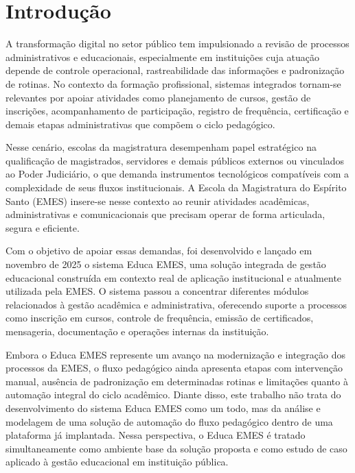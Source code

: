 %

\chapter{Introdução}
\label{sec:intro}

A transformação digital no setor público tem impulsionado a revisão de
processos administrativos e educacionais, especialmente em instituições cuja
atuação depende de controle operacional, rastreabilidade das informações e
padronização de rotinas. No contexto da formação profissional, sistemas
integrados tornam-se relevantes por apoiar atividades como planejamento de
cursos, gestão de inscrições, acompanhamento de participação, registro de
frequência, certificação e demais etapas administrativas que compõem o ciclo
pedagógico.

Nesse cenário, escolas da magistratura desempenham papel estratégico na
qualificação de magistrados, servidores e demais públicos externos ou vinculados ao Poder
Judiciário, o que demanda instrumentos tecnológicos compatíveis com a
complexidade de seus fluxos institucionais. A Escola da Magistratura do Espírito
Santo (EMES) insere-se nesse contexto ao reunir atividades acadêmicas,
administrativas e comunicacionais que precisam operar de forma articulada,
segura e eficiente.

Com o objetivo de apoiar essas demandas, foi desenvolvido e lançado em novembro
de 2025 o sistema Educa EMES, uma solução integrada de gestão educacional
construída em contexto real de aplicação institucional e atualmente utilizada
pela EMES. O sistema passou a concentrar diferentes módulos relacionados à
gestão acadêmica e administrativa, oferecendo suporte a processos como
inscrição em cursos, controle de frequência, emissão de certificados,
mensageria, documentação e operações internas da instituição.

Embora o Educa EMES represente um avanço na modernização e integração dos
processos da EMES, o fluxo pedagógico ainda apresenta etapas com intervenção
manual, ausência de padronização em determinadas rotinas e limitações quanto à
automação integral do ciclo acadêmico. Diante disso, este trabalho não trata do
desenvolvimento do sistema Educa EMES como um todo, mas da análise e modelagem
de uma solução de automação do fluxo pedagógico dentro de uma plataforma já
implantada. Nessa perspectiva, o Educa EMES é tratado simultaneamente como
ambiente base da solução proposta e como estudo de caso aplicado à gestão
educacional em instituição pública.

